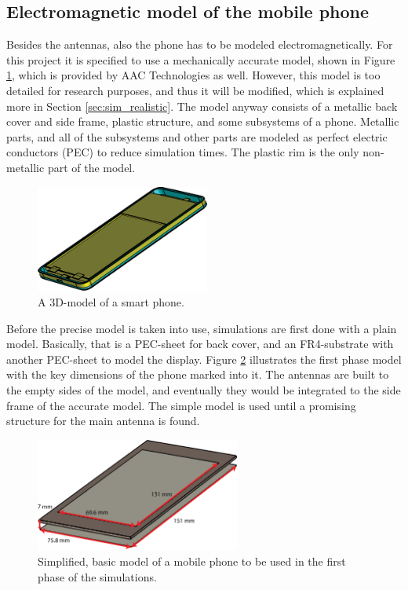 \vspace{-15pt}
\subsection{Electromagnetic model of the mobile phone}
\label{sec:phone}
Besides the antennas, also the phone has to be modeled electromagnetically. For this project it is specified to use a mechanically accurate model, shown in Figure \ref{fig:cad}, which is provided by AAC Technologies as well. However, this model is too detailed for research purposes, and thus it will be modified, which is explained more in Section \ref{sec:sim_realistic}. The model anyway consists of a metallic back cover and side frame, plastic structure, and some subsystems of a phone. Metallic parts, and all of the subsystems and other parts are modeled as perfect electric conductors (PEC) to reduce simulation times. The plastic rim is the only non-metallic part of the model.

\begin{figure}[H]
    \vspace{-7pt}
    \centering
    \includegraphics[width=0.51\textwidth]{img/cad.eps}
    \caption{A 3D-model of a smart phone.}
    \label{fig:cad}
\end{figure}

Before the precise model is taken into use, simulations are first done with a plain model. Basically, that is a PEC-sheet for back cover, and an FR4-substrate with another PEC-sheet to model the display. Figure \ref{fig:basic_structure} illustrates the first phase model with the key dimensions of the phone marked into it. The antennas are built to the empty sides of the model, and eventually they would be integrated to the side frame of the accurate model. The simple model is used until a promising structure for the main antenna is found. 
\begin{figure}[H]
    \centering
    \includegraphics[width=0.6\textwidth]{img/basic_structure.eps}
    \caption{Simplified, basic model of a mobile phone to be used in the first phase of the simulations.}
    \label{fig:basic_structure}
\end{figure}

